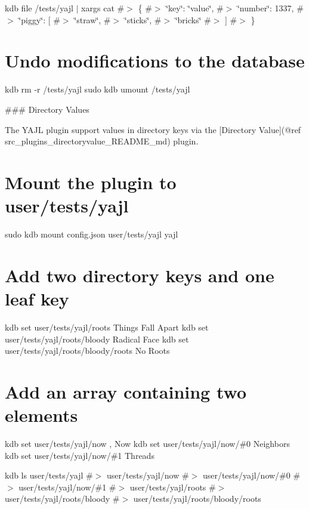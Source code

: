 kdb file /tests/yajl $\vert$ xargs cat \#$>$ \{ \#$>$ \char`\"{}key\char`\"{}\+: \char`\"{}value\char`\"{}, \#$>$ \char`\"{}number\char`\"{}\+: 1337, \#$>$ \char`\"{}piggy\char`\"{}\+: \mbox{[} \#$>$ \char`\"{}straw\char`\"{}, \#$>$ \char`\"{}sticks\char`\"{}, \#$>$ \char`\"{}bricks\char`\"{} \#$>$ \mbox{]} \#$>$ \}

\section*{Undo modifications to the database}

kdb rm -\/r /tests/yajl sudo kdb umount /tests/yajl 
\begin{DoxyCode}
### Directory Values

The YAJL plugin support values in directory keys via the [Directory Value](@ref
       src\_plugins\_directoryvalue\_README\_md) plugin.
\end{DoxyCode}
 \section*{Mount the plugin to {\ttfamily user/tests/yajl}}

sudo kdb mount config.\+json user/tests/yajl yajl

\section*{Add two directory keys and one leaf key}

kdb set user/tests/yajl/roots \textquotesingle{}Things Fall Apart\textquotesingle{} kdb set user/tests/yajl/roots/bloody \textquotesingle{}Radical Face\textquotesingle{} kdb set user/tests/yajl/roots/bloody/roots \textquotesingle{}No Roots\textquotesingle{}

\section*{Add an array containing two elements}

kdb set user/tests/yajl/now \textquotesingle{}, Now\textquotesingle{} kdb set user/tests/yajl/now/\#0 \textquotesingle{}Neighbors\textquotesingle{} kdb set user/tests/yajl/now/\#1 \textquotesingle{}Threads\textquotesingle{}

kdb ls user/tests/yajl \#$>$ user/tests/yajl/now \#$>$ user/tests/yajl/now/\#0 \#$>$ user/tests/yajl/now/\#1 \#$>$ user/tests/yajl/roots \#$>$ user/tests/yajl/roots/bloody \#$>$ user/tests/yajl/roots/bloody/roots

